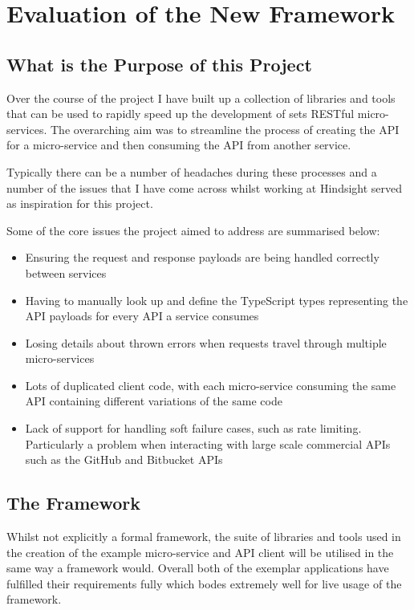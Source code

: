 \chapter{Evaluation of the New Framework}
\section{What is the Purpose of this Project}
Over the course of the project I have built up a collection of libraries and tools that can be used to rapidly speed up the development of sets RESTful micro-services. The overarching aim was to streamline the process of creating the API for a micro-service and then consuming the API from another service. 

Typically there can be a number of headaches during these processes and a number of the issues that I have come across whilst working at Hindsight 
served as inspiration for this project. 

Some of the core issues the project aimed to address are summarised below:
\begin{itemize}
    \item Ensuring the request and response payloads are being handled correctly between services
    \item Having to manually look up and define the TypeScript types representing the API payloads for every API a service consumes
    \item Losing details about thrown errors when requests travel through multiple micro-services
    \item Lots of duplicated client code, with each micro-service consuming the same API containing different variations of the same code
    \item Lack of support for handling soft failure cases, such as rate limiting. Particularly a problem when interacting with large scale commercial APIs such as the GitHub and Bitbucket APIs
\end{itemize}

\section{The Framework}
Whilst not explicitly a formal framework, the suite of libraries and tools used in the creation of the example micro-service and API client will be utilised in the same way a framework would. Overall both of the exemplar applications have fulfilled their requirements fully which bodes extremely well for live usage of the framework.

